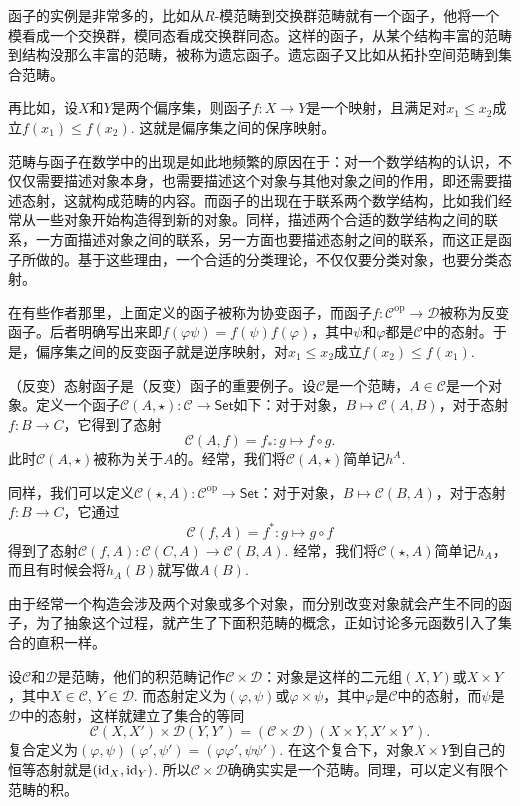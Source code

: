 函子的实例是非常多的，比如从$R$-模范畴到交换群范畴就有一个函子，他将一个模看成一个交换群，模同态看成交换群同态。这样的函子，从某个结构丰富的范畴到结构没那么丰富的范畴，被称为遗忘函子。遗忘函子又比如从拓扑空间范畴到集合范畴。

再比如，设$X$和$Y$是两个偏序集，则函子$f:X\to Y$是一个映射，且满足对$x_1\leq x_2$成立$f(x_1)\leq f(x_2)$. 这就是偏序集之间的保序映射。

范畴与函子在数学中的出现是如此地频繁的原因在于：对一个数学结构的认识，不仅仅需要描述对象本身，也需要描述这个对象与其他对象之间的作用，即还需要描述态射，这就构成范畴的内容。而函子的出现在于联系两个数学结构，比如我们经常从一些对象开始构造得到新的对象。同样，描述两个合适的数学结构之间的联系，一方面描述对象之间的联系，另一方面也要描述态射之间的联系，而这正是函子所做的。基于这些理由，一个合适的分类理论，不仅仅要分类对象，也要分类态射。

在有些作者那里，上面定义的函子被称为协变函子，而函子$f:\mathcal{C}^{\mathrm{op}} \to \mathcal{D}$被称为反变函子。后者明确写出来即$f(\varphi\psi)=f(\psi)f(\varphi)$，其中$\psi$和$\varphi$都是$\mathcal{C}$中的态射。于是，偏序集之间的反变函子就是逆序映射，对$x_1\leq x_2$成立$f(x_2)\leq f(x_1)$.

\para （反变）态射函子是（反变）函子的重要例子。设$\mathcal{C}$是一个范畴，$A\in \mathcal{C}$是一个对象。定义一个函子$\mathcal{C}(A,\star):\mathcal{C}\to \mathsf{Set}$如下：对于对象，$B\mapsto \mathcal{C}(A,B)$，对于态射$f:B\to C$，它得到了态射
\[
	\mathcal{C}(A,f)=f_*: g\mapsto f\circ g.
\]
此时$\mathcal{C}(A,\star)$被称为关于$A$的。经常，我们将$\mathcal{C}(A,\star)$简单记$h^A$.

同样，我们可以定义$\mathcal{C}(\star,A):\mathcal{C}^{\text{op}}\to \mathsf{Set}$：对于对象，$B\mapsto \mathcal{C}(B,A)$，对于态射$f:B\to C$，它通过
\[
	\mathcal{C}(f,A)=f^*: g\mapsto g\circ f
\]
得到了态射$\mathcal{C}(f,A):\mathcal{C}(C,A)\to \mathcal{C}(B,A)$. 经常，我们将$\mathcal{C}(\star,A)$简单记$h_A$，而且有时候会将$h_A(B)$就写做$A(B)$.

\para 由于经常一个构造会涉及两个对象或多个对象，而分别改变对象就会产生不同的函子，为了抽象这个过程，就产生了下面积范畴的概念，正如讨论多元函数引入了集合的直积一样。

设$\mathcal{C}$和$\mathcal{D}$是范畴，他们的积范畴记作$\mathcal{C}\times\mathcal{D}$：对象是这样的二元组$(X,Y)$或$X\times Y$，其中$X\in \mathcal{C}$, $Y\in\mathcal{D}$. 而态射定义为$(\varphi,\psi)$或$\varphi\times \psi$，其中$\varphi$是$\mathcal{C}$中的态射，而$\psi$是$\mathcal{D}$中的态射，这样就建立了集合的等同
\[
	{\mathcal{C}}(X,X')\times {\mathcal{D}}(Y,Y')=(\mathcal{C}\times \mathcal{D})(X\times Y,X'\times Y').
\]
复合定义为$(\varphi,\psi)(\varphi',\psi')=(\varphi\varphi',\psi\psi')$. 在这个复合下，对象$X\times Y$到自己的恒等态射就是$(\operatorname{id}_X,\operatorname{id}_Y)$. 所以$\mathcal{C}\times\mathcal{D}$确确实实是一个范畴。同理，可以定义有限个范畴的积。

